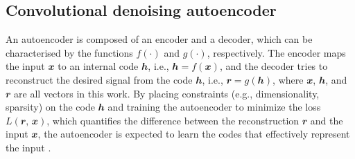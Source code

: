\documentclass[fleqn,usenatbib]{mnras}
\newcommand{\B}[1]{\mathbfit{#1}}
\begin{document}
\subsection{Convolutional denoising autoencoder}
\label{sec:cdae}

An autoencoder is composed of an encoder and a decoder, which can be
characterised by the functions $f(\cdot)$ and $g(\cdot)$, respectively.
The encoder maps the input $\B{x}$ to an internal code $\B{h}$, i.e.,
$\B{h} = f(\B{x})$, and the decoder tries to reconstruct the desired
signal from the code $\B{h}$, i.e., $\B{r} = g(\B{h})$, where $\B{x}$,
$\B{h}$, and $\B{r}$ are all vectors in this work.
By placing constraints (e.g., dimensionality, sparsity) on the
code $\B{h}$ and training the autoencoder to minimize the
loss $L(\B{r}, \,\B{x})$, which quantifies the difference between the
reconstruction $\B{r}$ and the input $\B{x}$, the autoencoder is expected
to learn the codes that effectively represent the input
\citep[chapter 14]{goodfellow2016}.
\end{document}
